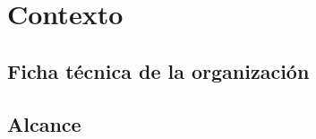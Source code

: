 \chapter{Contexto}
\label{chapter:context}

\section{Ficha técnica de la organización}
\label{section:ficha}

\Blindtext



\section{Alcance}
\label{section:alcance}

\Blindtext


